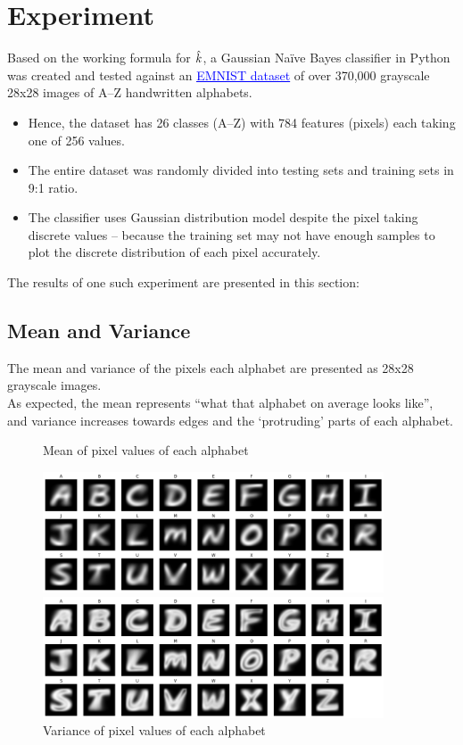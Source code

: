 \section{Experiment}

Based on the working formula for $\hat{k}$, a Gaussian Na\"ive Bayes classifier in Python was created and tested against an \href{https://drive.google.com/file/d/18ZY7I1ym0E9s2ecqjfvmPSGwlXzsNi2n}{\textcolor{blue}{\underline{EMNIST dataset}}} of over 370,000 grayscale 28x28 images of A--Z handwritten alphabets.
\begin{itemize}[noitemsep]
	\item Hence, the dataset has 26 classes (A--Z) with 784 features (pixels) each taking one of 256 values.
	\item The entire dataset was randomly divided into testing sets and training sets in 9:1 ratio.
	\item The classifier uses Gaussian distribution model despite the pixel taking discrete values -- because the training set may not have enough samples to plot the discrete distribution of each pixel accurately.
\end{itemize}
The results of one such experiment are presented in this section:

\subsection{Mean and Variance}
The mean and variance of the pixels each alphabet are presented as 28x28 grayscale images. \\
As expected, the mean represents ``what that alphabet on average looks like'', and variance increases towards edges and the `protruding' parts of each alphabet.
\begin{figure}[h]
	\centering
	\caption{Mean of pixel values of each alphabet}\par
	\includegraphics[width=0.9\textwidth]{fig/mean}\par
	\caption{Variance of pixel values of each alphabet}\par
	\includegraphics[width=0.9\textwidth]{fig/variance}
\end{figure}

